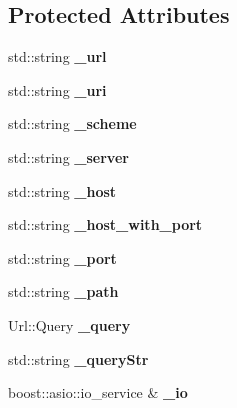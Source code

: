 \subsection*{Protected Attributes}
\begin{DoxyCompactItemize}
\item 
\mbox{\label{class_client_a714da8195cfe69bbb8fa1f254cfa53cd}} 
std\+::string {\bfseries \+\_\+url}
\item 
\mbox{\label{class_client_ade1bbfabad2a418db11741f9d6aef1de}} 
std\+::string {\bfseries \+\_\+uri}
\item 
\mbox{\label{class_client_a9080780007752190a708d566ed3a05f0}} 
std\+::string {\bfseries \+\_\+scheme}
\item 
\mbox{\label{class_client_a70d16da0e37d8395bab50d56c82d6aef}} 
std\+::string {\bfseries \+\_\+server}
\item 
\mbox{\label{class_client_a9b53e47e860f4656b348654643ddb76e}} 
std\+::string {\bfseries \+\_\+host}
\item 
\mbox{\label{class_client_a0984cf4f6e5d4a99e72b7189ab50826f}} 
std\+::string {\bfseries \+\_\+host\+\_\+with\+\_\+port}
\item 
\mbox{\label{class_client_a4671a4ffec3179a0ba4821b0d781b901}} 
std\+::string {\bfseries \+\_\+port}
\item 
\mbox{\label{class_client_a1c8113f51275dbb67633548399595ddc}} 
std\+::string {\bfseries \+\_\+path}
\item 
\mbox{\label{class_client_a4f5a6400fbe272f8212a88155cf7deb5}} 
Url\+::\+Query {\bfseries \+\_\+query}
\item 
\mbox{\label{class_client_afdcff50a83d67c071ebac089b21b16a1}} 
std\+::string {\bfseries \+\_\+query\+Str}
\item 
\mbox{\label{class_client_a6461a9372edd60a8aba63ae5ccc082fb}} 
boost\+::asio\+::io\+\_\+service \& {\bfseries \+\_\+io}
\item 

\end{DoxyCompactItemize}
